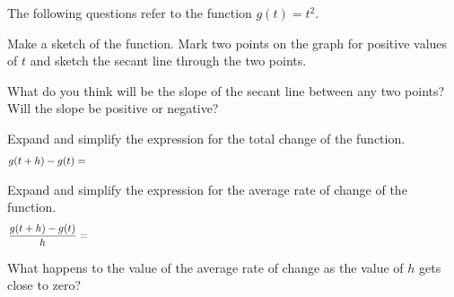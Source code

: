 \begin{problem}
  \item The following questions refer to the function $g(t)=t^2$.
    \begin{subproblem}
    \item Make a sketch of the function. Mark two points on the graph
      for positive values of $t$ and sketch the secant line through
      the two points.
      \vfill
      \item What do you think will be the slope of the secant line
        between any two points? Will the slope be positive or negative?
        \vspace{1em}
      \item Expand and simplify the expression for the total change
        of the function.
        \begin{eqnarray*}
          g(t+h)-g(t) & = & \hskip \textwidth
        \end{eqnarray*}
        \vfill
      \item Expand and simplify the expression for the average rate
        of change of the function.
      \begin{eqnarray*}
        \frac{g(t+h)-g(t)}{h} & = & \hskip \textwidth
      \end{eqnarray*}
      \vfill
    \item What happens to the value of the average rate of change as
      the value of $h$ gets close to zero?
      \vspace{3em}
    \end{subproblem}

    \clearpage


\end{problem}
